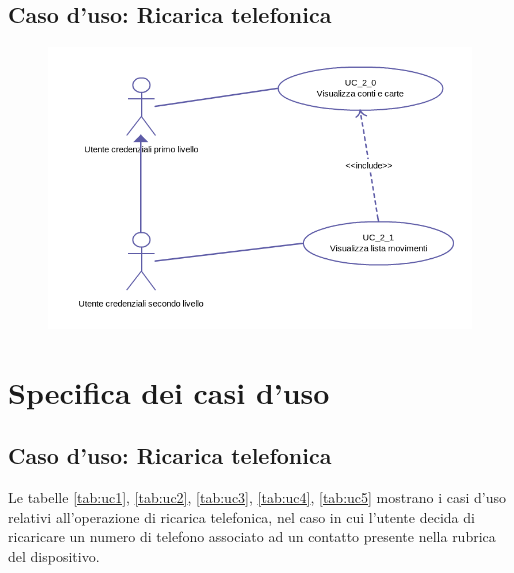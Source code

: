   \subsection{Caso d'uso: Ricarica telefonica}
 	\begin{figure}[!htbp]
	  \centering
	  \includegraphics[scale=0.65]{casi_uso/conti.png}
	\end{figure}
	

 \section{Specifica dei casi d'uso}
 
 \subsection{Caso d'uso: Ricarica telefonica}

 Le tabelle \ref{tab:uc1}, \ref{tab:uc2}, \ref{tab:uc3}, \ref{tab:uc4}, \ref{tab:uc5} mostrano i casi d'uso relativi all'operazione di ricarica telefonica, nel caso in cui l'utente decida di ricaricare un numero di telefono associato ad un contatto presente nella rubrica del dispositivo.
 
